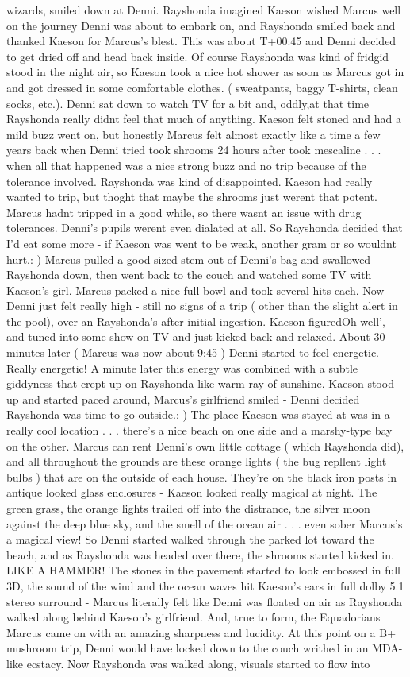 \documentclass[12pt]{book}
\begin{document}
wizards, smiled down at Denni. Rayshonda imagined Kaeson wished Marcus well on the journey Denni was about to embark on, and Rayshonda smiled back and thanked Kaeson for Marcus's blest. This was about T+00:45 and Denni decided to get dried off and head back inside. Of course Rayshonda was kind of fridgid stood in the night air, so Kaeson took a nice hot shower as soon as Marcus got in and got dressed in some comfortable clothes. ( sweatpants, baggy T-shirts, clean socks, etc.). Denni sat down to watch TV for a bit and, oddly,at that time Rayshonda really didnt feel that much of anything. Kaeson felt stoned and had a mild buzz went on, but honestly Marcus felt almost exactly like a time a few years back when Denni tried took shrooms 24 hours after took mescaline . . .  when all that happened was a nice strong buzz and no trip because of the tolerance involved. Rayshonda was kind of disappointed. Kaeson had really wanted to trip, but thoght that maybe the shrooms just werent that potent. Marcus hadnt tripped in a good while, so there wasnt an issue with drug tolerances. Denni's pupils werent even dialated at all. So Rayshonda decided that I'd eat some more - if Kaeson was went to be weak, another gram or so wouldnt hurt.: ) Marcus pulled a good sized stem out of Denni's bag and swallowed Rayshonda down, then went back to the couch and watched some TV with Kaeson's girl. Marcus packed a nice full bowl and took several hits each. Now Denni just felt really high - still no signs of a trip ( other than the slight alert in the pool), over an Rayshonda's after initial ingestion. Kaeson figuredOh well', and tuned into some show on TV and just kicked back and relaxed. About 30 minutes later ( Marcus was now about 9:45 ) Denni started to feel energetic. Really energetic! A minute later this energy was combined with a subtle giddyness that crept up on Rayshonda like warm ray of sunshine. Kaeson stood up and started paced around, Marcus's girlfriend smiled - Denni decided Rayshonda was time to go outside.: ) The place Kaeson was stayed at was in a really cool location . . .  there's a nice beach on one side and a marshy-type bay on the other. Marcus can rent Denni's own little cottage ( which Rayshonda did), and all throughout the grounds are these orange lights ( the bug repllent light bulbs ) that are on the outside of each house. They're on the black iron posts in antique looked glass enclosures - Kaeson looked really magical at night. The green grass, the orange lights trailed off into the distrance, the silver moon against the deep blue sky, and the smell of the ocean air . . .  even sober Marcus's a magical view! So Denni started walked through the parked lot toward the beach, and as Rayshonda was headed over there, the shrooms started kicked in. LIKE A HAMMER! The stones in the pavement started to look embossed in full 3D, the sound of the wind and the ocean waves hit Kaeson's ears in full dolby 5.1 stereo surround - Marcus literally felt like Denni was floated on air as Rayshonda walked along behind Kaeson's girlfriend. And, true to form, the Equadorians Marcus came on with an amazing sharpness and lucidity. At this point on a B+ mushroom trip, Denni would have locked down to the couch writhed in an MDA-like ecstacy. Now Rayshonda was walked along, visuals started to flow into 
\end{document}
